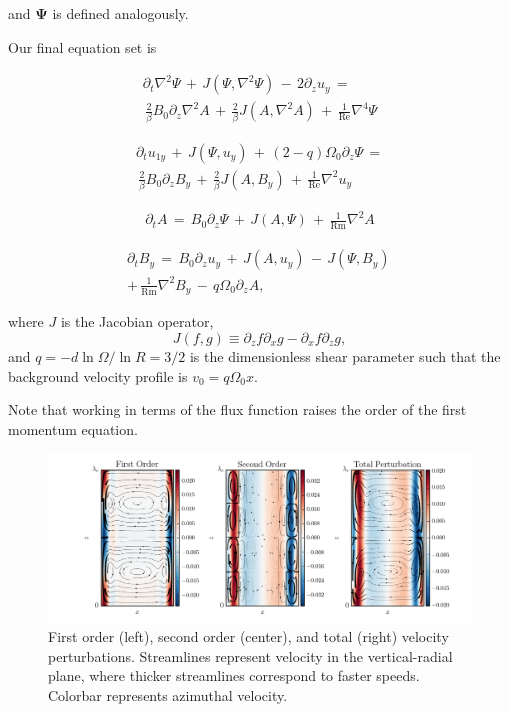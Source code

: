 \documentclass{emulateapj}
\newcommand{\beq}{\begin{equation}}
\newcommand{\eeq}{\end{equation}}
\newcommand\reye{\mathrm{Re}}
\newcommand\reym{\mathrm{Rm}}
\begin{document}
and $\mathbf{\Psi}$ is defined analogously.

Our final equation set is

\begin{multline}
\label{eqset1}
\partial_t \nabla^2 \Psi \, + \, J\left(\Psi, \nabla^2 \Psi\right) \, - \, 2 \partial_z u_{y} \, = \\
\, \frac{2}{\beta} B_0 \partial_z \nabla^2 A \, + \, \frac{2}{\beta}J\left(A, \nabla^2 A \right) \, + \, \frac{1}{\reye}\nabla^4 \Psi
\end{multline}

\begin{multline}
\label{eqset2}
\partial_t u_{1y} \, + \, J\left(\Psi, u_{y}\right) \, + \, \left(2 - q\right) \Omega_0 \partial_z \Psi \, = \\
\, \frac{2}{\beta}B_0\partial_z B_{y} \, + \, \frac{2}{\beta} J\left(A, B_{y}\right) \, + \, \frac{1}{\reye} \nabla^2 u_{y}
\end{multline}

\begin{multline}
\label{eqset3}
\partial_t A \, = \, B_0 \partial_z \Psi \, + \, J\left(A, \Psi\right) \, + \, \frac{1}{\reym} \nabla^2 A
\end{multline}

\begin{multline}
\label{eqset4}
\partial_t B_{y} \, = \, B_0 \partial_z u_{y} \, + \, J\left(A, u_{y}\right) \, - \, J\left(\Psi, B_{y}\right) \, \\
+ \, \frac{1}{\reym} \nabla^2 B_{y}  \, - \, q \Omega_0 \partial_z A,
\end{multline}

where $J$ is the Jacobian operator, 
\beq
J\left(f, g\right) \equiv \partial_z f\partial_x g - \partial_x f \partial_z g,
\eeq  
and $q = - d \ln \Omega/ \ln R = 3/2$ is the dimensionless shear parameter such that the background velocity profile is $v_0 = q \Omega_0 x$.

Note that working in terms of the flux function raises the order of the first momentum equation.

\begin{figure}
\centering
\includegraphics[width=\textwidth]{../figures/thingap_streamfuncs_velocity_Pm_1E-3.png}%
\caption{First order (left), second order (center), and total (right) velocity perturbations. Streamlines represent velocity in the vertical-radial plane, where thicker streamlines correspond to faster speeds. Colorbar represents azimuthal velocity.}\label{allorders_velocity}
\end{figure}
\end{document}
